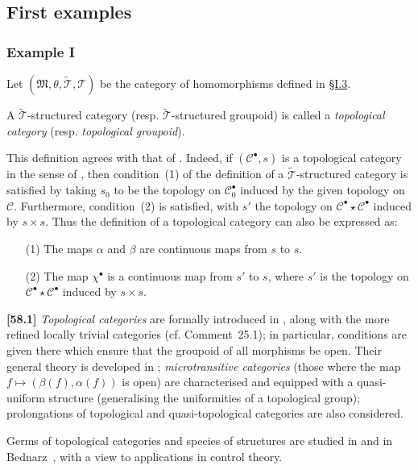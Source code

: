 \documentclass[a4paper,fleqn]{article}
\theoremstyle{plain}
\theoremstyle{definition}
\newenvironment{definition}[1]
  {\renewcommand\theinnerdefinition{#1}\innerdefinition}
  {\endinnerdefinition}
\newenvironment{longcomm}[1]
  {\noindent\textbf{[#1]}\rmfamily}
  {}
\newcommand{\CC}{\mathcal{C}}
\newcommand{\MM}{\mathfrak{M}}
\newcommand{\TT}{\mathcal{T}}
\newcommand{\tTT}{\widetilde{\TT}}
\begin{document}
\subsection{First examples}
\label{section:ii.3}

\subsubsection*{Example I}
\label{section:ii.3.i}

Let $(\MM,\theta,\tTT,\TT)$ be the category of homomorphisms defined in \hyperref[section:i.3]{§I.3}.

\begin{definition}{7}
\label{definition:ii-7}
  A $\tTT$-structured category (resp. $\tTT$-structured groupoid) is called a \emph{topological category} (resp. \emph{topological groupoid}).
\end{definition}

This definition agrees with that of \cite{3b}.
Indeed, if $(\CC^\bullet,s)$ is a topological category in the sense of \cite{3b}, then condition~(1) of the definition of a $\tTT$-structured category is satisfied by taking $s_0$ to be the topology on $\CC_0^\bullet$ induced by the given topology on $\CC$.
Furthermore, condition~(2) is satisfied, with $s'$ the topology on $\CC^\bullet\star\CC^\bullet$ induced by $s\times s$.
Thus the definition of a topological category can also be expressed as:

\begin{enumerate}
  \item[\normalfont(1)]
    The maps $\alpha$ and $\beta$ are continuous maps from $s$ to $s$.
  \item[\normalfont(2)]
    The map $\chi^\bullet$ is a continuous map from $s'$ to $s$, where $s'$ is the topology on $\CC^\bullet\star\CC^\bullet$ induced by $s\times s$.
\end{enumerate}

\begin{longcomm}{58.1}
  \emph{Topological categories} are formally introduced in \cite{coll50}, along with the more refined locally trivial categories (cf. Comment~25.1);
  in particular, conditions are given there which ensure that the groupoid of all morphisms be open.
  Their general theory is developed in \cite{coll92};
  \emph{microtransitive categories} (those where the map $f\mapsto(\beta(f),\alpha(f))$ is open) are characterised and equipped with a quasi-uniform structure (generalising the uniformities of a topological group);
  prolongations of topological and quasi-topological categories are also considered.

  Germs of topological categories and species of structures are studied in \cite{comm29} and in Bednarz~\cite{comm3}, with a view to applications in control theory.
\end{longcomm}
\end{document}
